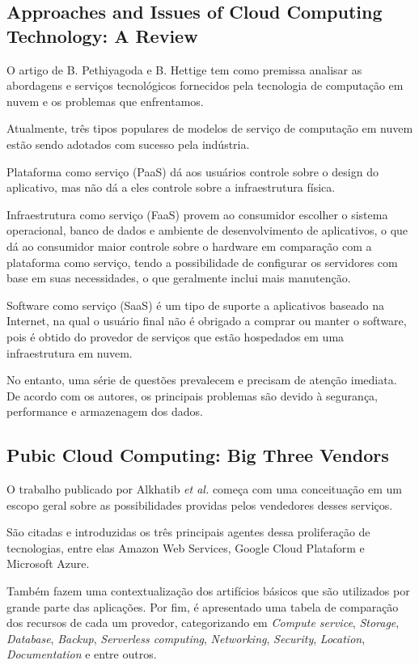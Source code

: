 \documentclass[12pt]{article}
\begin{document}
\subsection{Approaches and Issues of Cloud Computing Technology: A Review \cite{pethi}}

O artigo de B. Pethiyagoda e B. Hettige tem como premissa analisar as abordagens e serviços tecnológicos fornecidos pela tecnologia de computação em nuvem e os problemas que enfrentamos.

Atualmente, três tipos populares de modelos de serviço de computação em nuvem estão sendo adotados com sucesso pela indústria. 

Plataforma como serviço (PaaS) dá aos usuários controle sobre o design do aplicativo, mas não dá a eles controle sobre a infraestrutura física. 

Infraestrutura como serviço (FaaS) provem ao consumidor escolher o sistema operacional, banco de dados e ambiente de desenvolvimento de aplicativos, o que dá ao consumidor maior controle sobre o hardware em comparação com a plataforma como serviço, tendo a possibilidade de configurar os servidores com base em suas necessidades, o que geralmente inclui mais manutenção.

Software como serviço (SaaS) é um tipo de suporte a aplicativos baseado na Internet, na qual o usuário final não é obrigado a comprar ou manter o software, pois é obtido do provedor de serviços que estão hospedados em uma infraestrutura em nuvem.

No entanto, uma série de questões prevalecem e precisam de atenção imediata. De acordo com os autores, os principais problemas são devido à segurança, performance e armazenagem dos dados.

\subsection{Pubic Cloud Computing: Big Three Vendors \cite{randa}}

O trabalho publicado por Alkhatib \emph{et al.} começa com uma conceituação em um escopo geral sobre as possibilidades providas pelos vendedores desses serviços.

São citadas e introduzidas os três principais agentes dessa proliferação de tecnologias, entre elas Amazon Web Services, Google Cloud Plataform e Microsoft Azure.

Também fazem uma contextualização dos artifícios básicos que são utilizados por grande parte das aplicações. Por fim, é apresentado uma tabela de comparação dos recursos de cada um provedor, categorizando em \emph{Compute service}, \emph{Storage}, \emph{Database}, \emph{Backup}, \emph{Serverless computing}, \emph{Networking}, \emph{Security}, \emph{Location}, \emph{Documentation} e entre outros.
\end{document}
